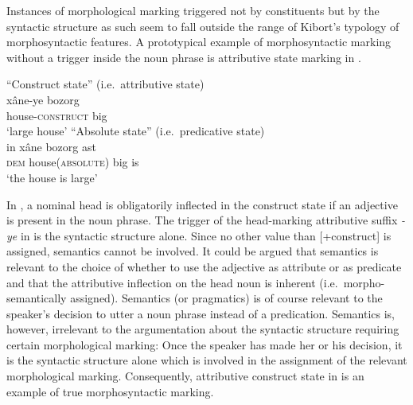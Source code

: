 Instances of morphological marking triggered not by constituents but by the syntactic structure as such seem to fall outside the range of Kibort's typology of morphosyntactic features. A prototypical example of morphosyntactic marking without a trigger inside the noun phrase is attributive state marking in .
\begin{exe}
\ex 
{}
\label{persian state}
\begin{xlist}
\ex 
{\rm “Construct state” (i.e.~attributive state)}\\
\gll 	xâne-ye bozorg\\
	house-\textsc{construct} big\\
\glt 	‘large house’
\ex 
{\rm “Absolute state” (i.e.~predicative state)}\\
\gll	in xâne bozorg ast\\
	\textsc{dem} house(\textsc{absolute}) big is\\
\glt	‘the house is large’
\end{xlist}
\end{exe}
In , a nominal head is obligatorily inflected in the construct state if an adjective is present in the noun phrase. The trigger of the head-marking attributive suffix \textit{-ye} in  is the syntactic structure alone. Since no other value than [+construct] is assigned, semantics cannot be involved. It could be argued that semantics is relevant to the choice of whether to use the adjective as attribute or as predicate and that the attributive inflection on the head noun is inherent (i.e.~morpho-semantically assigned). Semantics (or pragmatics) is of course relevant to the speaker's decision to utter a noun phrase instead of a predication. Semantics is, however, irrelevant to the argumentation about the syntactic structure requiring certain morphological marking: Once the speaker has made her or his decision, it is the syntactic structure alone which is involved in the assignment of the relevant morphological marking. Consequently, attributive construct state in  is an example of true morphosyntactic marking.

